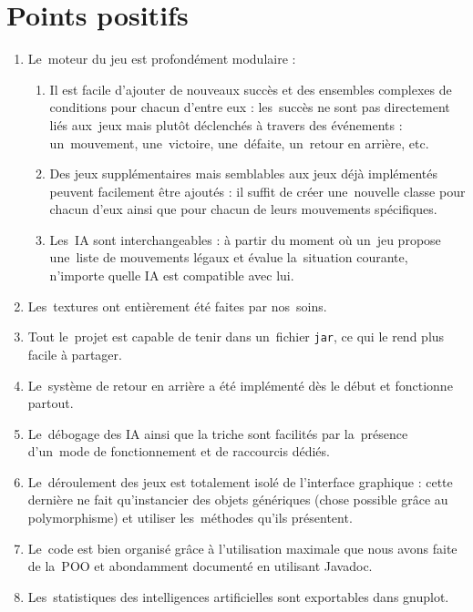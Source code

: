 \section{Points positifs}
\begin{enumerate}
	\item Le~moteur du jeu est profondément modulaire :
	\begin{enumerate}
		\item Il est facile d'ajouter de nouveaux succès et des ensembles complexes 
				de conditions pour chacun d'entre eux : les~succès ne sont pas 
				directement liés aux~jeux mais plutôt déclenchés à travers des événements : 
				un~mouvement, une~victoire, une~défaite, un~retour en arrière, etc.
		\item Des jeux supplémentaires mais semblables aux jeux déjà implémentés peuvent facilement 
				être ajoutés : il suffit de créer une~nouvelle classe pour chacun d'eux ainsi que 
				pour chacun de leurs mouvements spécifiques.
		\item Les~IA sont interchangeables : à partir du moment où un~jeu propose 
				une~liste de mouvements légaux et évalue la~situation courante, 
				n'importe quelle IA est compatible avec lui.
	\end{enumerate}
	
	\item Les~textures ont entièrement été faites par nos~soins.

	\item Tout le~projet est capable de tenir dans un~fichier \texttt{jar}, ce qui le rend plus facile à partager.

	\item Le~système de retour en arrière a été implémenté dès le début et fonctionne partout.

	\item Le~débogage des IA ainsi que la triche sont facilités par la~présence d'un~mode de fonctionnement et de raccourcis dédiés.

	\item Le~déroulement des jeux est totalement isolé de l'interface graphique : cette dernière 
			ne fait qu'instancier des objets génériques (chose possible grâce au polymorphisme) et 
			utiliser les~méthodes qu'ils présentent. 

	\item Le~code est bien organisé grâce à l'utilisation maximale que nous avons faite de la~POO et abondamment documenté en utilisant Javadoc.
	
	\item Les~statistiques des intelligences artificielles sont exportables dans gnuplot.
\end{enumerate}